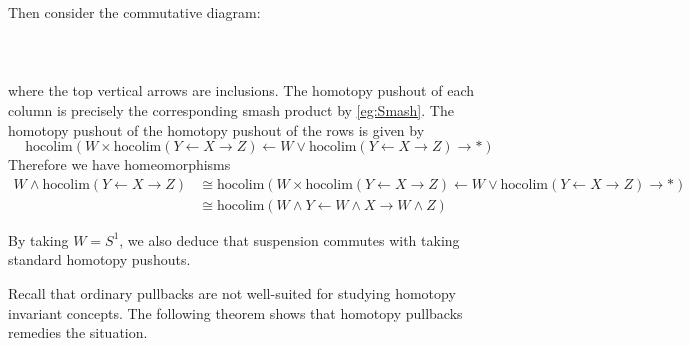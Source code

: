 \documentclass[a4paper]{article}
\begin{document}
\begin{eg}{}{}
Then consider the commutative diagram: \\~\\
\\~\\
where the top vertical arrows are inclusions. The homotopy pushout of each column is precisely the corresponding smash product by \ref{eg:Smash}. The homotopy pushout of the homotopy pushout of the rows is given by $$\text{hocolim}(W\times\text{hocolim}(Y\leftarrow X\rightarrow Z)\leftarrow W\vee\text{hocolim}(Y\leftarrow X\rightarrow Z)\rightarrow\ast)$$ Therefore we have homeomorphisms 
\begin{align*}
W\wedge\text{hocolim}(Y\leftarrow X\rightarrow Z)&\cong\text{hocolim}(W\times\text{hocolim}(Y\leftarrow X\rightarrow Z)\leftarrow W\vee\text{hocolim}(Y\leftarrow X\rightarrow Z)\rightarrow\ast)\\
&\cong\text{hocolim}(W\wedge Y\leftarrow W\wedge X\rightarrow W\wedge Z)
\end{align*}
\end{eg}

By taking $W=S^1$, we also deduce that suspension commutes with taking standard homotopy pushouts. 

Recall that ordinary pullbacks are not well-suited for studying homotopy invariant concepts. The following theorem shows that homotopy pullbacks remedies the situation. 
\end{document}
